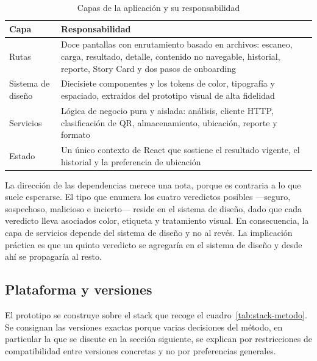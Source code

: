 \begin{table}[H]
    \centering
    \caption{Capas de la aplicación y su responsabilidad}
    \begin{tabular}{@{}>{\raggedright\arraybackslash}p{3.2cm}>{\raggedright\arraybackslash}p{8.5cm}@{}}
        \toprule
        \textbf{Capa} & \textbf{Responsabilidad} \\
        \midrule
        Rutas & Doce pantallas con enrutamiento basado en archivos: escaneo, carga, resultado, detalle, contenido no navegable, historial, reporte, Story Card y dos pasos de onboarding \\
        Sistema de diseño & Diecisiete componentes y los tokens de color, tipografía y espaciado, extraídos del prototipo visual de alta fidelidad \\
        Servicios & Lógica de negocio pura y aislada: análisis, cliente HTTP, clasificación de QR, almacenamiento, ubicación, reporte y formato \\
        Estado & Un único contexto de React que sostiene el resultado vigente, el historial y la preferencia de ubicación \\
        \bottomrule
    \end{tabular}
    \label{tab:capas}
\end{table}

La dirección de las dependencias merece una nota, porque es contraria a lo que suele
esperarse. El tipo que enumera los cuatro veredictos posibles ---seguro, sospechoso,
malicioso e incierto--- reside en el sistema de diseño, dado que cada veredicto lleva
asociados color, etiqueta y tratamiento visual. En consecuencia, la capa de servicios
depende del sistema de diseño y no al revés. La implicación práctica es que un quinto
veredicto se agregaría en el sistema de diseño y desde ahí se propagaría al resto.

\subsection{Plataforma y versiones}

El prototipo se construye sobre el stack que recoge el cuadro~\ref{tab:stack-metodo}.
Se consignan las versiones exactas porque varias decisiones del método, en particular
la que se discute en la sección siguiente, se explican por restricciones de
compatibilidad entre versiones concretas y no por preferencias generales.

